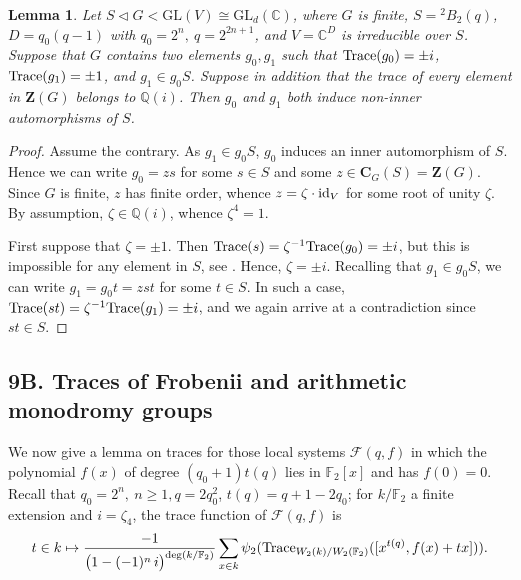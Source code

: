 \documentclass[11pt]{amsart}
\theoremstyle{plain}
\newtheorem{lem}[thm]{Lemma}
\theoremstyle{definition}
\numberwithin{thm}{section}
\numberwithin{equation}{thm}
\newcommand{\Trace}{{\rm Trace}}
\newcommand{\GL}{\mathrm{GL}}
\newcommand{\sF}{{\mathcal F}}
\newcommand{\C}{{\mathbb C}}
\newcommand{\F}{{\mathbb F}}
\newcommand{\Q}{{\mathbb Q}}
\newcommand{\0}{\emptyset}
\newcommand{\id}{{\rm id}}
\newcommand{\ZB}{{\mathbf Z}}
\newcommand{\CB}{{\mathbf C}}
\newcommand{\tw}[1]{{}^#1\!}
\begin{document}
\begin{lem}\label{action2}
Let $S \lhd G < \GL(V)\cong \GL_d(\C)$, where $G$ is finite, $S = \tw2 B_2(q)$, $D = q_0(q-1)$ with $q_0=2^n,\ q=2^{2n+1}$, 
and $V = \C^D$ is irreducible over $S$.
Suppose that $G$ contains two elements $g_0, g_1$ such that $\Trace(g_0) = \pm i$, $\Trace(g_1) = \pm 1$, and
$g_1 \in g_0S$. 
Suppose in addition that the trace of every element in $\ZB(G)$ belongs to $\Q(i)$. Then $g_0$ and $g_1$ both induce
non-inner automorphisms of $S$.
\end{lem}
 
\begin{proof}
Assume the contrary. As $g_1 \in g_0S$, $g_0$ induces an inner automorphism of $S$. Hence we can write 
$g_0 = zs$ for some $s \in S$ and some $z \in \CB_{G}(S) = \ZB(G)$. Since $G$ is finite, $z$ has finite order,
whence $z = \zeta \cdot \id_V$ for some root of unity $\zeta$. By assumption, $\zeta \in \Q(i)$, whence $\zeta^4=1$.

First suppose that $\zeta = \pm 1$. Then $\Trace(s) = \zeta^{-1} \Trace(g_0) = \pm i$, but this is impossible for any element in 
$S$, see \cite{Suz}. Hence, $\zeta = \pm i$. Recalling that $g_1 \in g_0S$, we can write $g_1=g_0t = zst$ for some
$t \in S$. In such a case, $\Trace(st) = \zeta^{-1}\Trace(g_1) = \pm i$, and we again arrive at a contradiction since 
$st \in S$.
\end{proof} 

\subsection*{9B. Traces of Frobenii and arithmetic monodromy groups}
 We now give a lemma on traces for those local systems $\sF(q,f)$ in which the polynomial $f(x)$ of degree $(q_0+1)t(q)$ lies in $\F_2[x]$ and has $f(0)=0$.
Recall that $q_0=2^n,\ n \ge 1, q=2q_0^2$, $t(q) =q+1-2q_0$; for $k/\F_2$ a finite extension and $i=\zeta_4$, the trace function of  $\sF(q,f)$ is
$$ t \in k \mapsto  \frac{-1}{\bigl(1-(-1)^n\,i\bigr)^{\deg(k/\F_2)}}\sum_{x \in k}\psi_2(\Trace_{W_2(k)/W_2(\F_2)}([x^{t(q)},f(x)+tx])).$$
\end{document}
